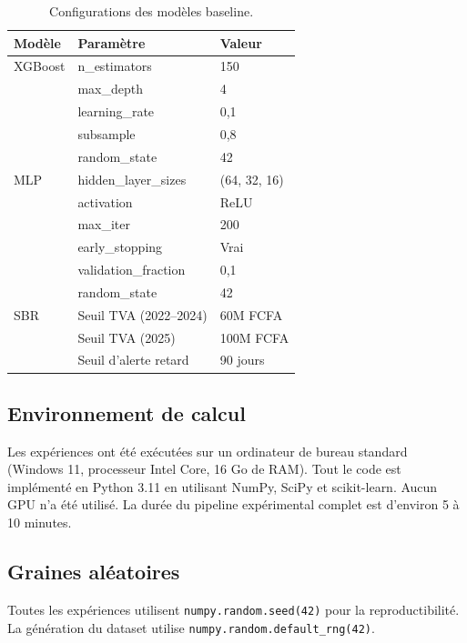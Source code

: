 \documentclass[letterpaper]{article}
\begin{document}
\begin{table}[H]
\centering
\caption{Configurations des mod\`eles baseline.}
\renewcommand{\arraystretch}{1.2}
\begin{tabular}{lll}
\toprule
\textbf{Mod\`ele} & \textbf{Param\`etre} & \textbf{Valeur} \\
\midrule
XGBoost & n\_estimators & 150 \\
        & max\_depth & 4 \\
        & learning\_rate & 0,1 \\
        & subsample & 0,8 \\
        & random\_state & 42 \\[4pt]
MLP     & hidden\_layer\_sizes & (64, 32, 16) \\
        & activation & ReLU \\
        & max\_iter & 200 \\
        & early\_stopping & Vrai \\
        & validation\_fraction & 0,1 \\
        & random\_state & 42 \\[4pt]
SBR     & Seuil TVA (2022--2024) & 60M FCFA \\
        & Seuil TVA (2025) & 100M FCFA \\
        & Seuil d'alerte retard & 90 jours \\
\bottomrule
\end{tabular}
\end{table}

\subsection{Environnement de calcul}

Les exp\'eriences ont \'et\'e ex\'ecut\'ees sur un ordinateur de
bureau standard (Windows 11, processeur Intel Core, 16 Go de RAM).
Tout le code est impl\'ement\'e en Python 3.11 en utilisant NumPy,
SciPy et scikit-learn. Aucun GPU n'a \'et\'e utilis\'e. La dur\'ee
du pipeline exp\'erimental complet est d'environ 5 \`a 10 minutes.

\subsection{Graines al\'eatoires}

Toutes les exp\'eriences utilisent \texttt{numpy.random.seed(42)}
pour la reproductibilit\'e. La g\'en\'eration du dataset utilise
\texttt{numpy.random.default\_rng(42)}.
\end{document}
